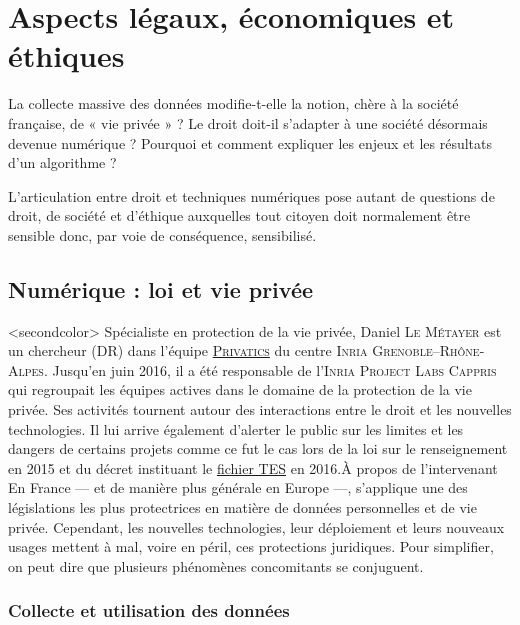 \section[Loi, économie et éthique]{Aspects légaux, économiques et éthiques}
\label{sec:I.4}


La collecte massive des données modifie-t-elle la notion, chère à la société française, de « vie privée » ? Le droit doit-il s'adapter à une société désormais devenue numérique ? Pourquoi et comment expliquer les enjeux et les résultats d'un algorithme ? 

L'articulation entre droit et techniques numériques pose autant de questions de droit, de société et d'éthique auxquelles tout citoyen doit normalement être sensible donc, par voie de conséquence, sensibilisé.

\subsection[Numérique : loi et vie privée]{Numérique : loi et vie privée}
\label{sub:I.4.1}

\caution[t]<secondcolor>{%
Spécialiste en protection de la vie privée, Daniel \textsc{Le Métayer} est un chercheur (DR) dans l'équipe \href{https://www.inria.fr/equipes/privatics}{\textsc{Privatics}} du centre \textsc{Inria} \textsc{Grenoble--Rhône-Alpes}. 
Jusqu'en juin 2016, il a été responsable de l'\textsc{Inria Project Labs Cappris} qui regroupait les équipes actives dans le domaine de la protection de la vie privée.
Ses activités tournent autour des interactions entre le droit et les nouvelles technologies. Il lui arrive également d'alerter le public sur les limites et les dangers de certains projets comme ce fut le cas lors de la loi sur le renseignement en 2015 et du décret instituant le \href{https://fr.wikipedia.org/wiki/Fichier_des_titres_\%C3\%A9lectroniques_s\%C3\%A9curis\%C3\%A9s}{fichier TES} en 2016.}{À propos de l'intervenant}
En France --- et de manière plus générale en Europe ---, s'applique une des législations les plus protectrices en matière de données personnelles et de vie privée. Cependant, les nouvelles technologies, leur déploiement et leurs nouveaux usages mettent à mal, voire en péril, ces protections juridiques.
Pour simplifier, on peut dire que plusieurs phénomènes concomitants se conjuguent.

\subsubsection[Données]{Collecte et utilisation des données}
\label{subsub:I.4.1.1}

